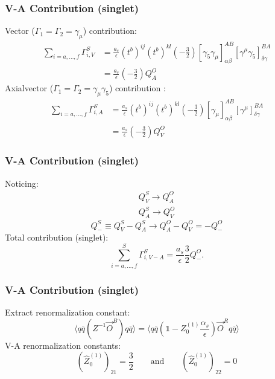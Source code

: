 \documentclass{beamer}
\begin{document}
\begin{frame}
\frametitle{V-A Contribution (singlet)}
Vector ($\Gamma_1 = \Gamma_2 = \gamma_\mu$) contribution:
\begin{equation*}
\begin{split}
	\sum_{i=a,\ldots,f}\Gamma^S_{i,V} &= \frac{a_s}{\epsilon} (t^b)^{ij} (t^b)^{kl} \left(-\frac{3}{2}\right) \left[\gamma_5 \gamma_\mu\right]^{AB}_{\alpha\beta} \left[\gamma^\mu \gamma_5 \right]^{BA}_{\delta\gamma} \\
	&= \frac{a_s}{\epsilon}\left(-\frac{3}{2}\right) Q^O_A 
\end{split}
\end{equation*}
Axialvector ($\Gamma_1 = \Gamma_2 = \gamma_\mu\gamma_5$) contribution :
\begin{equation*}
\begin{split}
	 \sum_{i=a,\ldots,f} \Gamma^S_{i,A} &= \frac{a_s}{\epsilon}(t^b)^{ij}(t^b)^{kl}\left(-\frac{3}{2}\right) \left[\gamma_\mu\right]^{AB}_{\alpha\beta} \left[\gamma^\mu\right]^{BA}_{\delta\gamma} \\
&= \frac{a_s}{\epsilon} \left(-\frac{3}{2}\right) Q^O_V
\end{split}
\end{equation*}
\end{frame}

\begin{frame}
\frametitle{V-A Contribution (singlet)}
Noticing:
\begin{equation*}
\begin{split}
	Q^S_V \rightarrow Q^O_A \\
	Q^S_A \rightarrow Q^O_V
\end{split}
\end{equation*}
\begin{equation*}
	Q^S_- \equiv Q^S_V - Q^S_A \rightarrow Q^O_A - Q^O_V = - Q^O_-
\end{equation*}
Total contribution (singlet):
\begin{equation*}
	\sum^S_{i=a,\ldots,f} \Gamma^S_{i,V-A} = \frac{a_s}{\epsilon} \frac{3}{2} Q^O_-.
\end{equation*}
\end{frame}

\begin{frame}
\frametitle{V-A Contribution (singlet)}
Extract renormalization constant:
\begin{equation*}
	\langle q \bar q ( Z^{-1} \vec O^B   ) q \bar q\rangle = \langle q \bar q (\mathds{1} - Z_0^{(1)} \frac{\alpha_s}{\epsilon}) \vec O^R q \bar q \rangle
\end{equation*}
V-A renormalization constants:
\begin{equation*}
	(\hat Z^{(1)}_0)_{21} = \frac{3}{2} \qquad \text{and} \qquad (\hat Z^{(1)}_0)_{22} = 0	
\end{equation*} 
\end{frame}
\end{document}
